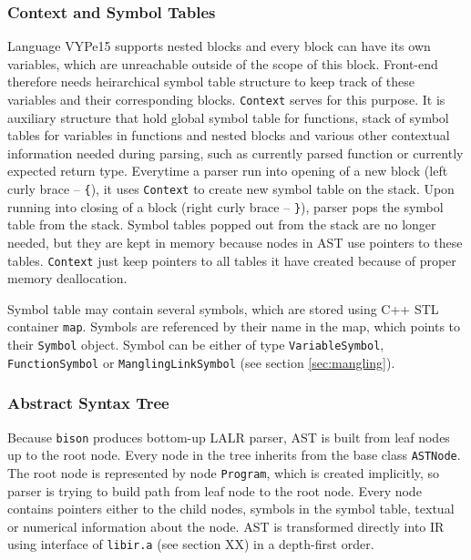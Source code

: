 \documentclass[12pt]{article}
\begin{document}
\subsubsection{Context and Symbol Tables}
Language VYPe15 supports nested blocks and every block can have its own variables, which are unreachable outside of the scope of this block. Front-end
therefore needs heirarchical symbol table structure to keep track of these variables and their corresponding blocks. \texttt{Context} serves for this purpose.
It is auxiliary structure that hold global symbol table for functions, stack of symbol tables for variables in functions and nested blocks
and various other contextual information needed during parsing, such as currently parsed function
or currently expected return type. Everytime a parser run into opening of a new block (left curly brace -- \texttt{\{}), it uses \texttt{Context} to create
new symbol table on the stack. Upon running into closing of a block (right curly brace -- \texttt{\}}), parser pops the symbol table from the stack. Symbol tables
popped out from the stack are no longer needed, but they are kept in memory because nodes in AST use pointers to these tables. \texttt{Context} just keep
pointers to all tables it have created because of proper memory deallocation.

Symbol table may contain several symbols, which are stored using C++ STL container \texttt{map}. Symbols are referenced by their name in the map,
which points to their \texttt{Symbol} object. Symbol can be either of type \texttt{VariableSymbol}, \texttt{FunctionSymbol} or \texttt{ManglingLinkSymbol}
(see section \ref{sec:mangling}).

\subsubsection{Abstract Syntax Tree}
Because \texttt{bison} produces bottom-up LALR parser, AST is built from leaf nodes up to the root node. Every node in the tree inherits from the
base class \texttt{ASTNode}. The root node is represented by node \texttt{Program}, which is created implicitly, so parser is trying to build
path from leaf node to the root node. Every node contains pointers either to the child nodes, symbols in the symbol table, textual or numerical
information about the node. AST is transformed directly into IR using interface of \texttt{libir.a} (see section XX) in a depth-first order.
\end{document}
